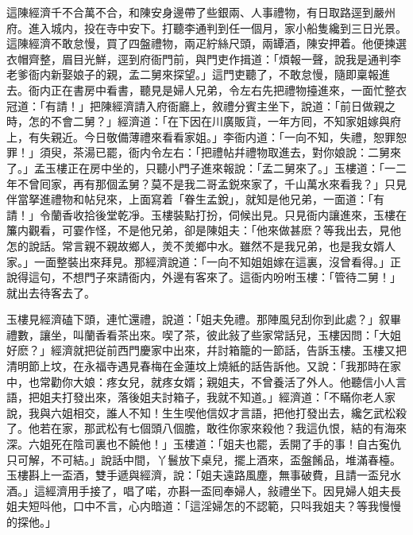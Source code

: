 這陳經濟千不合萬不合，和陳安身邊帶了些銀兩、人事禮物，有日取路逕到嚴州府。進入城内，投在寺中安下。打聽李通判到任一個月，家小船隻纔到三日光景。這陳經濟不敢怠慢，買了四盤禮物，兩疋紵絲尺頭，兩罈酒，陳安押着。他便揀選衣帽齊整，眉目光鮮，逕到府衙門前，與門吏作揖道：「煩報一聲，說我是通判李老爹衙内新娶娘子的親，孟二舅來探望。」這門吏聽了，不敢怠慢，隨即稟報進去。衙内正在書房中看書，聽見是婦人兄弟，令左右先把禮物擡進來，一面忙整衣冠道：「有請！」把陳經濟請入府衙廳上，敘禮分賓主坐下，說道：「前日做親之時，怎的不會二舅？」經濟道：「在下因在川廣販貨，一年方囘，不知家姐嫁與府上，有失親近。今日敬備薄禮來看看家姐。」李衙内道：「一向不知，失禮，恕罪恕罪！」須臾，茶湯已罷，衙内令左右：「把禮帖幷禮物取進去，對你娘說：二舅來了。」孟玉樓正在房中坐的，只聽小門子進來報說：「孟二舅來了。」玉樓道：「一二年不曾囘家，再有那個孟舅？莫不是我二哥孟鋭來家了，千山萬水來看我？」只見伴當拏進禮物和帖兒來，上面寫着「眷生孟銳」，就知是他兄弟，一面道：「有請！」令蘭香收拾後堂乾凈。玉樓裝點打扮，伺候出見。只見衙内讓進來，玉樓在簾内觀看，可霎作怪，不是他兄弟，卻是陳姐夫：「他來做甚麽？等我出去，見他怎的說話。常言親不親故鄉人，羙不羙鄉中水。雖然不是我兄弟，也是我女婿人家。」一面整裝出來拜見。那經濟說道：「一向不知姐姐嫁在這裏，沒曾看得。」正說得這句，不想門子來請衙内，外邊有客來了。這衙内吩咐玉樓：「管待二舅！」就出去待客去了。

玉樓見經濟磕下頭，連忙還禮，說道：「姐夫免禮。那陣風兒刮你到此處？」叙畢禮數，讓坐，叫蘭香看茶出來。喫了茶，彼此敍了些家常話兒，玉樓因問：「大姐好麽？」經濟就把従前西門慶家中出來，幷討箱籠的一節話，告訴玉樓。玉樓又把清明節上坟，在永福寺遇見春梅在金蓮坟上燒紙的話告訴他。又說：「我那時在家中，也常勸你大娘：疼女兒，就疼女婿；親姐夫，不曾養活了外人。他聽信小人言語，把姐夫打發出來，落後姐夫討箱子，我就不知道。」經濟道：「不瞞你老人家說，我與六姐相交，誰人不知！生生喫他信奴才言語，把他打發出去，纔乞武松殺了。他若在家，那武松有七個頭八個膽，敢徃你家來殺他？我這仇恨，結的有海來深。六姐死在陰司裏也不饒他！」玉樓道：「姐夫也罷，丢開了手的事！自古寃仇只可解，不可結。」說話中間，丫鬟放下桌兒，擺上酒來，盃盤餚品，堆滿春檯。玉樓斟上一盃酒，雙手遞與經濟，說：「姐夫遠路風塵，無事破費，且請一盃兒水酒。」這經濟用手接了，唱了喏，亦斟一盃囘奉婦人，敍禮坐下。因見婦人姐夫長姐夫短呌他，口中不言，心内暗道：「這淫婦怎的不認範，只呌我姐夫？等我慢慢的探他。」

